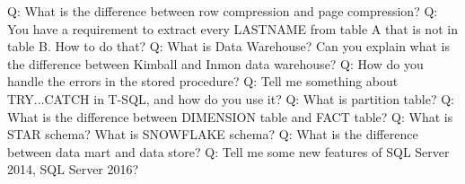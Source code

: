 \documentclass[a4paper,11pt]{article}
\begin{document}
\noindent 
Q: What is the difference between row compression and page compression? \newline \newline
\noindent 
Q: You have a requirement to extract every LASTNAME from table A that is not in table B. How to do that? \newline \newline
\noindent 
Q: What is Data Warehouse? Can you explain what is the difference between Kimball and Inmon data warehouse? \newline \newline
\noindent 
Q: How do you handle the errors in the stored procedure? \newline \newline
\noindent 
Q: Tell me something about TRY...CATCH in T-SQL, and how do you use it? \newline \newline
\noindent 
Q: What is partition table? \newline \newline
\noindent 
Q: What is the difference between DIMENSION table and FACT table? \newline \newline
\noindent 
Q: What is STAR schema? What is SNOWFLAKE schema? \newline \newline
\noindent 
Q: What is the difference between data mart and data store? \newline \newline
\noindent 
Q: Tell me some new features of SQL Server 2014, SQL Server 2016? \newline \newline
\end{document}
